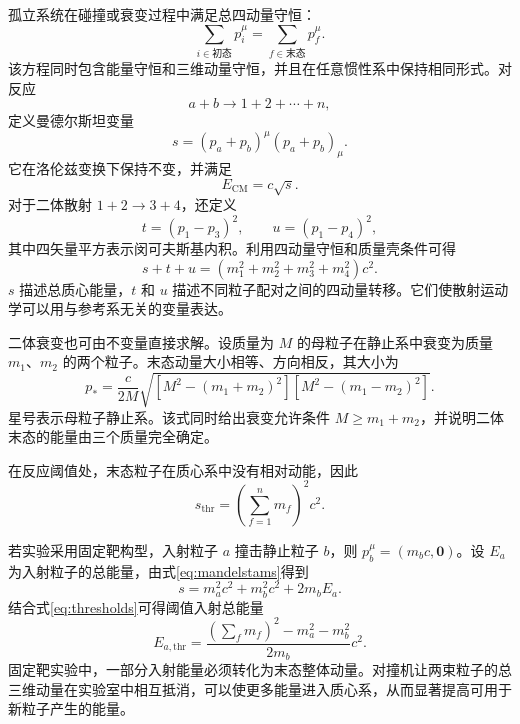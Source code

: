 \documentclass[style=classic,color=full]{lc-article}
\begin{document}
孤立系统在碰撞或衰变过程中满足总四动量守恒：
\begin{equation}
  \boxed{
  \sum_{i\in\text{初态}}p_i^\mu
  =\sum_{f\in\text{末态}}p_f^\mu.}
  \label{eq:fourmomentumconservation}
\end{equation}
该方程同时包含能量守恒和三维动量守恒，并且在任意惯性系中保持相同形式。对反应
\begin{equation*}
  a+b\longrightarrow 1+2+\cdots+n,
\end{equation*}
定义曼德尔斯坦变量
\begin{equation}
  s=(p_a+p_b)^\mu(p_a+p_b)_\mu.
  \label{eq:mandelstams}
\end{equation}
它在洛伦兹变换下保持不变，并满足
\begin{equation}
  E_{\mathrm{CM}}=c\sqrt{s}.
\end{equation}
对于二体散射 $1+2\to3+4$，还定义
\begin{equation}
  t=(p_1-p_3)^2,
  \qquad
  u=(p_1-p_4)^2,
  \label{eq:mandelstamtu}
\end{equation}
其中四矢量平方表示闵可夫斯基内积。利用四动量守恒和质量壳条件可得
\begin{equation}
  s+t+u=(m_1^2+m_2^2+m_3^2+m_4^2)c^2.
  \label{eq:mandelstamrelation}
\end{equation}
$s$ 描述总质心能量，$t$ 和 $u$ 描述不同粒子配对之间的四动量转移。它们使散射运动学可以用与参考系无关的变量表达。

二体衰变也可由不变量直接求解。设质量为 $M$ 的母粒子在静止系中衰变为质量 $m_1$、$m_2$ 的两个粒子。末态动量大小相等、方向相反，其大小为
\begin{equation}
  p_*
  =\frac{c}{2M}
  \sqrt{\left[M^2-(m_1+m_2)^2\right]
        \left[M^2-(m_1-m_2)^2\right]}.
  \label{eq:twobodydecaymomentum}
\end{equation}
星号表示母粒子静止系。该式同时给出衰变允许条件 $M\ge m_1+m_2$，并说明二体末态的能量由三个质量完全确定。

在反应阈值处，末态粒子在质心系中没有相对动能，因此
\begin{equation}
  s_{\mathrm{thr}}
  =\left(\sum_{f=1}^{n}m_f\right)^2c^2.
  \label{eq:thresholds}
\end{equation}

若实验采用固定靶构型，入射粒子 $a$ 撞击静止粒子 $b$，则 $p_b^\mu=(m_bc,\bm0)$。设 $E_a$ 为入射粒子的总能量，由式\eqref{eq:mandelstams}得到
\begin{equation}
  s=m_a^2c^2+m_b^2c^2+2m_bE_a.
\end{equation}
结合式\eqref{eq:thresholds}可得阈值入射总能量
\begin{equation}
  \boxed{
  E_{a,\mathrm{thr}}
  =\frac{
    \left(\sum_fm_f\right)^2-m_a^2-m_b^2
  }{2m_b}c^2.}
  \label{eq:thresholdenergy}
\end{equation}
固定靶实验中，一部分入射能量必须转化为末态整体动量。对撞机让两束粒子的总三维动量在实验室中相互抵消，可以使更多能量进入质心系，从而显著提高可用于新粒子产生的能量\cite{pdg2024,taylorwheeler}。
\end{document}
